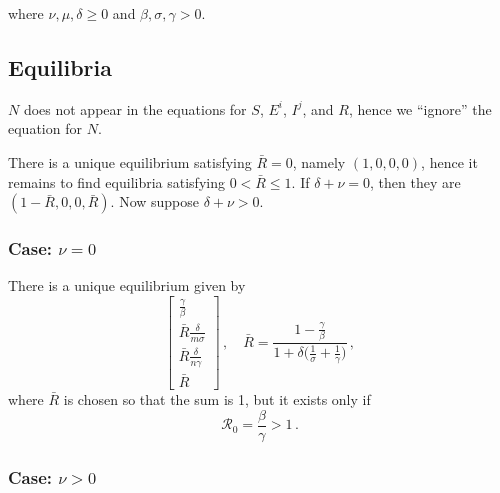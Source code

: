 \documentclass[fleqn]{article}
\begin{document}
where $\nu,\mu,\delta \geq 0$ and $\beta,\sigma,\gamma > 0$.

\subsection{Equilibria}

$N$ does not appear in the equations for $S$, $E^{i}$, $I^{j}$, and $R$,
hence we ``ignore'' the equation for $N$.

There is a unique equilibrium satisfying $\bar{R} = 0$,
namely $(1, 0, 0, 0)$,
hence it remains to find equilibria satisfying $0 < \bar{R} \leq 1$.
If $\delta + \nu = 0$, then they are $(1 - \bar{R}, 0, 0, \bar{R})$.
Now suppose $\delta + \nu > 0$.

\subsubsection{Case: $\nu = 0$}

There is a unique equilibrium given by
\begin{equation}
\begin{bmatrix}
  \frac{\gamma}{\beta} \\
  \bar{R} \frac{\delta}{m \sigma} \\
  \bar{R} \frac{\delta}{n \gamma} \\
  \bar{R}
\end{bmatrix}
\,,\quad
\bar{R} = \frac{1 - \frac{\gamma}{\beta}}{1 + \delta \big(\frac{1}{\sigma} + \frac{1}{\gamma}\big)}\,,
\end{equation}
where $\bar{R}$ is chosen so that the sum is 1, but it exists only if
\begin{equation}
\mathcal{R}_{0} = \frac{\beta}{\gamma} > 1\,.
\end{equation}

\subsubsection{Case: $\nu > 0$}
\end{document}
